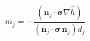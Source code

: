 $$
m_j = - \frac{\left(\mathbf n_j\cdot \boldsymbol\sigma\nabla\hat h\right)}{\left(\mathbf n_j\cdot \boldsymbol\sigma\,\mathbf n_j\right) d_j}
$$
